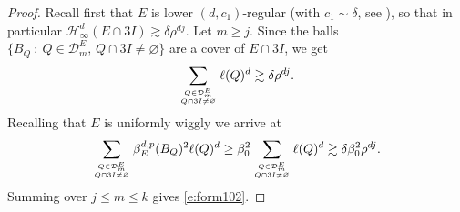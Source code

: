 \documentclass[11pt,reqno]{amsart}
\theoremstyle{definition}
\theoremstyle{remark}
\numberwithin{equation}{section}
\newcommand{\hdc}{\mathcal{H}^d_\infty}
\newcommand{\dD}{\mathcal{D}}
\newcommand{\DD}{\mathcal{D}}
\theoremstyle{theorem}
\theoremstyle{definition}
\theoremstyle{remark}
\numberwithin{equation}{section}
\begin{document}
	\begin{proof}
		Recall first that $E$ is lower $(d, c_1)$-regular (with $c_1 \sim \delta$, see ), so that in particular $\hdc(E\cap 3I)\gtrsim \delta \rho^{dj}$. Let $m\ge j$. Since the balls $\{B_Q\ :\ Q\in \DD^E_m,\, Q\cap 3I\neq\varnothing\}$ are a cover of $E\cap 3I$, we get
		\begin{equation*}
		\sum_{Q \in \dD^E_m \atop Q \cap 3I\neq\varnothing} \ell(Q)^d \gtrsim \delta \rho^{dj}.
		\end{equation*}		
		Recalling that $E$ is uniformly wiggly we arrive at
		\begin{equation*}
		\sum_{Q \in \dD^E_m \atop Q \cap 3I \neq \varnothing} \beta_{E}^{d,p}(B_Q)^2 \ell(Q)^d 
		\geq  \beta_0^2 \sum_{Q \in \dD^E_m \atop Q \cap 3I\neq\varnothing} \ell(Q)^d
		 \gtrsim \delta \beta_0^2 \rho^{dj}.
		\end{equation*}
		Summing over $j\le m\le k$ gives \eqref{e:form102}. 
	\end{proof}
	
\end{document}
